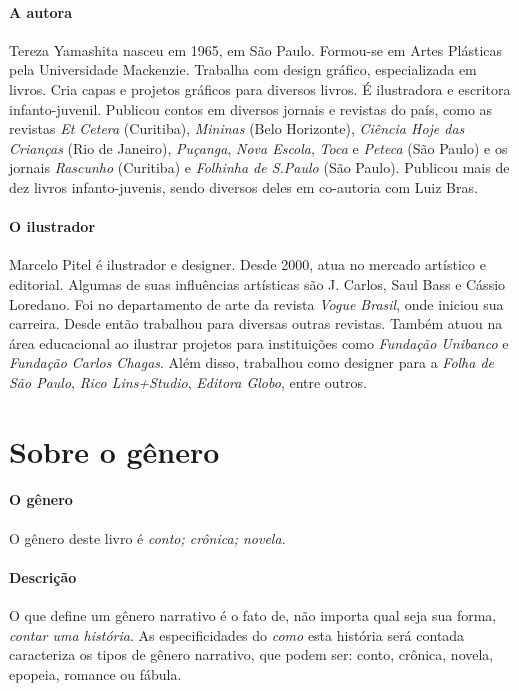 \documentclass[11pt]{extarticle}
\begin{document}
\paragraph{A autora} Tereza Yamashita nasceu em 1965, em São Paulo. Formou-se em Artes Plásticas pela Universidade Mackenzie. Trabalha com design gráfico, especializada em livros. Cria capas e projetos gráficos para diversos livros. É ilustradora e escritora infanto-juvenil. Publicou contos em diversos jornais e revistas do país, como as revistas \textit{Et Cetera} (Curitiba), \textit{Mininas} (Belo Horizonte), \textit{Ciência Hoje das Crianças} (Rio de Janeiro), \textit{Puçanga}, \textit{Nova Escola}, \textit{Toca} e \textit{Peteca} (São Paulo) e os jornais \textit{Rascunho} (Curitiba) e \textit{Folhinha de S.Paulo} (São Paulo). Publicou mais de dez livros infanto-juvenis, sendo diversos deles em co-autoria com Luiz Bras.

\paragraph{O ilustrador} Marcelo Pitel é ilustrador e designer. Desde 2000, atua no mercado artístico e editorial. Algumas de suas influências artísticas são J. Carlos, Saul Bass e Cássio Loredano. Foi no departamento de arte da revista \textit{Vogue Brasil}, onde iniciou sua carreira. Desde então trabalhou para diversas outras revistas. Também atuou na área educacional ao ilustrar projetos para instituições como \textit{Fundação Unibanco} e \textit{Fundação Carlos Chagas}. Além disso, trabalhou como designer para a \textit{Folha de São Paulo}, \textit{Rico Lins+Studio}, \textit{Editora Globo}, entre outros.


\section{Sobre o gênero}

\paragraph{O gênero} O gênero deste livro é \textit{conto; crônica; novela}.

\paragraph{Descrição} O que define um gênero narrativo é o fato de, não importa qual seja sua forma, \textit{contar uma história}.
As especificidades do \textit{como} esta história será contada caracteriza os tipos de gênero narrativo, que podem ser: conto, crônica, novela, epopeia, romance ou fábula. 
\end{document}
